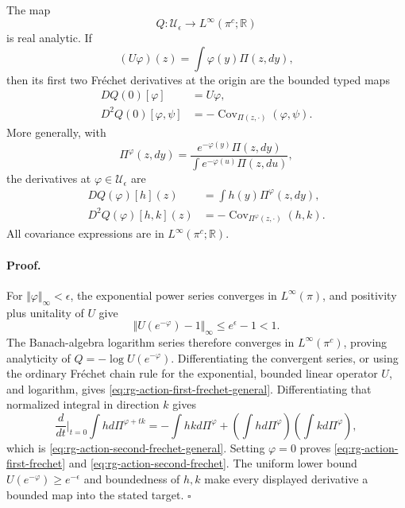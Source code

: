 The map
\begin{equation}
Q:\mathcal U_\epsilon\longrightarrow
L^\infty(\pi^c;\mathbb R)
\label{eq:rg-local-action-map-typed}
\end{equation}
is real analytic.  If
\begin{equation}
(U\varphi)(z)=\int\varphi(y)\Pi(z,dy),
\label{eq:rg-reverse-conditional-expectation}
\end{equation}
then its first two Fr\'echet derivatives at the origin are the bounded typed
maps
\begin{align}
DQ(0)[\varphi]&=U\varphi,
\label{eq:rg-action-first-frechet}\\
D^2Q(0)[\varphi,\psi]
&=-\operatorname{Cov}_{\Pi(z,\cdot)}(\varphi,\psi).
\label{eq:rg-action-second-frechet}
\end{align}
More generally, with
\begin{equation}
\Pi^\varphi(z,dy)=
\frac{e^{-\varphi(y)}\Pi(z,dy)}
{\int e^{-\varphi(u)}\Pi(z,du)},
\label{eq:rg-tilted-reverse-kernel}
\end{equation}
the derivatives at \(\varphi\in\mathcal U_\epsilon\) are
\begin{align}
DQ(\varphi)[h](z)&=\int h(y)\Pi^\varphi(z,dy),
\label{eq:rg-action-first-frechet-general}\\
D^2Q(\varphi)[h,k](z)&=
-\operatorname{Cov}_{\Pi^\varphi(z,\cdot)}(h,k).
\label{eq:rg-action-second-frechet-general}
\end{align}
All covariance expressions are in
\(L^\infty(\pi^c;\mathbb R)\). 

\paragraph{Proof.}
For \(\Vert\varphi\Vert_\infty<\epsilon\), the exponential power series
converges in \(L^\infty(\pi)\), and positivity plus unitality of \(U\)
give
\begin{equation}
\Vert U(e^{-\varphi})-1\Vert_\infty
\leq e^\epsilon-1<1.
\label{eq:rg-action-log-series-radius}
\end{equation}
The Banach-algebra logarithm series therefore converges in
\(L^\infty(\pi^c)\), proving analyticity of
\(Q=-\log U(e^{-\varphi})\).  Differentiating the convergent series, or
using the ordinary Fr\'echet chain rule for the exponential, bounded linear
operator \(U\), and logarithm, gives
\eqref{eq:rg-action-first-frechet-general}.  Differentiating that normalized
integral in direction \(k\) gives
\begin{equation}
\frac{d}{dt}\bigg|_{t=0}
\int h d\Pi^{\varphi+tk}
=-\int hk d\Pi^\varphi
+\left(\int h d\Pi^\varphi\right)
\left(\int k d\Pi^\varphi\right),
\label{eq:rg-action-covariance-derivation}
\end{equation}
which is \eqref{eq:rg-action-second-frechet-general}.  Setting
\(\varphi=0\) proves \eqref{eq:rg-action-first-frechet} and
\eqref{eq:rg-action-second-frechet}.  The uniform lower bound
\(U(e^{-\varphi})\geq e^{-\epsilon}\) and boundedness of \(h,k\) make
every displayed derivative a bounded map into the stated target.  \(\square\)

